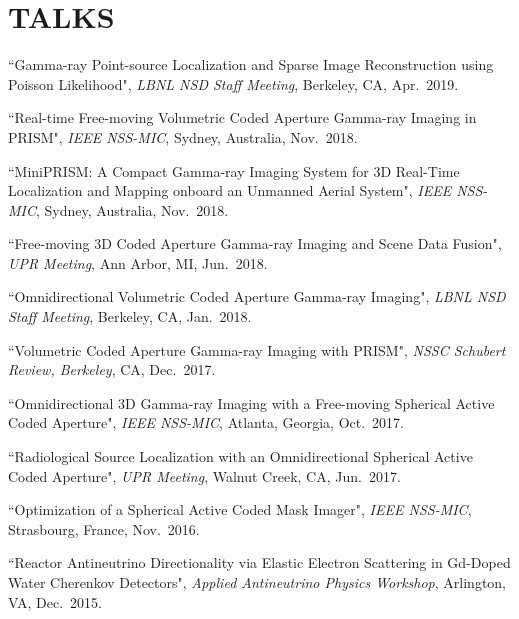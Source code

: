 \section{\small{TALKS}}

\vspace{10pt}
\begin{enumerate}[label={[\arabic*]}, leftmargin=*, labelsep=10pt, align=left]
    \item ``Gamma-ray Point-source Localization and Sparse Image Reconstruction using Poisson Likelihood", \emph{LBNL NSD Staff Meeting}, Berkeley, CA, Apr.~2019.
    \item ``Real-time Free-moving Volumetric Coded Aperture Gamma-ray Imaging in PRISM", \emph{IEEE NSS-MIC}, Sydney, Australia, Nov.~2018.
    \item ``MiniPRISM: A Compact Gamma-ray Imaging System for 3D Real-Time Localization and Mapping onboard an Unmanned Aerial System", \emph{IEEE NSS-MIC}, Sydney, Australia, Nov.~2018.
    \item ``Free-moving 3D Coded Aperture Gamma-ray Imaging and Scene Data Fusion", \emph{UPR Meeting}, Ann Arbor, MI, Jun.~2018.
    \item ``Omnidirectional Volumetric Coded Aperture Gamma-ray Imaging", \emph{LBNL NSD Staff Meeting}, Berkeley, CA, Jan.~2018.
    \item ``Volumetric Coded Aperture Gamma-ray Imaging with PRISM", \emph{NSSC Schubert Review, Berkeley}, CA, Dec.~2017.
    \item ``Omnidirectional 3D Gamma-ray Imaging with a Free-moving Spherical Active Coded Aperture", \emph{IEEE NSS-MIC}, Atlanta, Georgia, Oct.~2017.
    \item ``Radiological Source Localization with an Omnidirectional Spherical Active Coded Aperture", \emph{UPR Meeting}, Walnut Creek, CA, Jun.~2017.
    \item ``Optimization of a Spherical Active Coded Mask Imager", \emph{IEEE NSS-MIC}, Strasbourg, France, Nov.~2016.
    \item \hspace{-5pt}``Reactor Antineutrino Directionality via Elastic Electron Scattering in Gd-Doped Water Cherenkov Detectors", \emph{Applied Antineutrino Physics Workshop}, Arlington, VA, Dec.~2015.
\end{enumerate}

